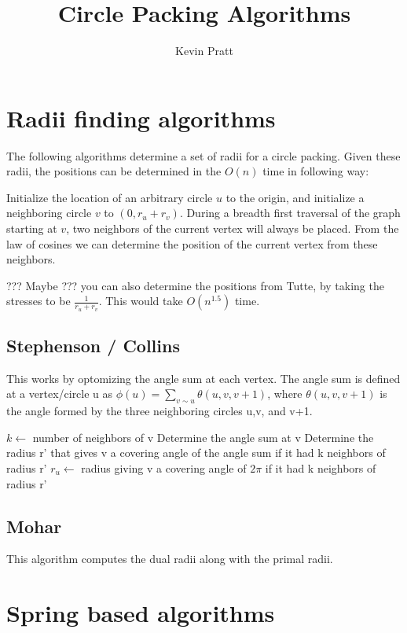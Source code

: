 \documentclass{article}
\title{Circle Packing Algorithms}
\author{Kevin Pratt}
\begin{document}
\maketitle


\section{Radii finding algorithms}


The following algorithms determine a set of radii for a circle packing. Given these radii, the positions can be determined in the $O(n)$ time in following way:

Initialize the location of an arbitrary circle $u$ to the origin, and initialize a neighboring circle $v$ to $(0,r_u + r_v)$.
During a breadth first traversal of the graph starting at $v$, two neighbors of the current vertex will always be placed. From the law of cosines we can determine the position of the current vertex from these neighbors.

??? Maybe ??? you can also determine the positions from Tutte, by taking the stresses to be $\frac{1}{r_u+r_v}$. This would take $O(n^{1.5})$ time.

\subsection{Stephenson / Collins}

This works by optomizing the angle sum at each vertex. The angle sum is defined at a vertex/circle u as $\phi(u) = \sum_{v \sim u}^{} \theta(u, v, v+1)$, where $\theta(u,v,v+1)$ is the angle formed by the three neighboring circles u,v, and v+1.\\
\begin{algorithmic}
				\State $k\gets$ number of neighbors of v
				\State Determine the angle sum at v
				\State Determine the radius r' that gives v a covering angle of the angle sum if it had k neighbors of radius r'
				\State $r_u \gets$ radius giving v a covering angle of $2\pi$ if it had k neighbors of radius r'
		\EndFor
\EndWhile
\end{algorithmic}


\subsection{Mohar}
This algorithm computes the dual radii along with the primal radii.
\section{Spring based algorithms}
\end{document}
